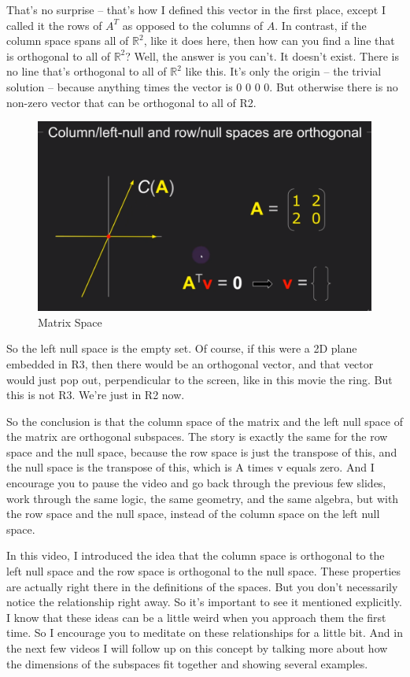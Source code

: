 \documentclass[fleqn,10pt]{olplainarticle}
\theoremstyle{definition}
\theoremstyle{remark}
\begin{document}
That's no surprise -- that's how I defined this vector in the first place, except I called it the rows of $A^T$ as opposed to the columns of $A$. In contrast, if the column space spans all of $\mathbb{R}^2$, like it does here, then how can you find a line that is orthogonal to all of $\mathbb{R}^2$? Well, the answer is you can't. It doesn't exist. There is no line that's orthogonal to all of $\mathbb{R}^2$ like this. It's only the origin -- the trivial solution -- because anything times the vector is 0 0 0 0. But otherwise there is no non-zero vector that can be orthogonal to all of R2.

\begin{figure}[ht]
	\centering
	\includegraphics[width=0.6\linewidth]{images/matrix-space-30.png}
	\caption{Matrix Space}
	\label{fig:matrix_space_30}
\end{figure}

So the left null space is the empty set. Of course, if this were a 2D plane embedded in R3, then there would be an orthogonal vector, and that vector would just pop out, perpendicular to the screen, like in this movie the ring. But this is not R3. We're just in R2 now.

So the conclusion is that the column space of the matrix and the left null space of the matrix are orthogonal subspaces. The story is exactly the same for the row space and the null space, because the row space is just the transpose of this, and the null space is the transpose of this, which is A times v equals zero. And I encourage you to pause the video and go back through the previous few slides, work through the same logic, the same geometry, and the same algebra, but with the row space and the null space, instead of the column space on the left null space.

In this video, I introduced the idea that the column space is orthogonal to the left null space and the row space is orthogonal to the null space. These properties are actually right there in the definitions of the spaces. But you don't necessarily notice the relationship right away. So it's important to see it mentioned explicitly. I know that these ideas can be a little weird when you approach them the first time. So I encourage you to meditate on these relationships for a little bit. And in the next few videos I will follow up on this concept by talking more about how the dimensions of the subspaces fit together and showing several examples.
\end{document}
